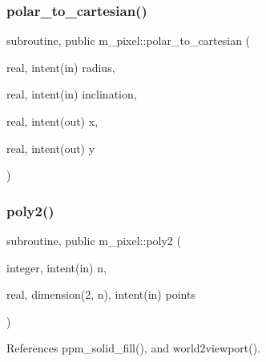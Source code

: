 \subsubsection{\texorpdfstring{polar\+\_\+to\+\_\+cartesian()}{polar\_to\_cartesian()}}
{\footnotesize\ttfamily subroutine, public m\+\_\+pixel\+::polar\+\_\+to\+\_\+cartesian (\begin{DoxyParamCaption}\item[{real, intent(in)}]{radius,  }\item[{real, intent(in)}]{inclination,  }\item[{real, intent(out)}]{x,  }\item[{real, intent(out)}]{y }\end{DoxyParamCaption})}

\mbox{\label{namespacem__pixel_a996117d631dce0e92056a0c486be5109}} 
\subsubsection{\texorpdfstring{poly2()}{poly2()}}
{\footnotesize\ttfamily subroutine, public m\+\_\+pixel\+::poly2 (\begin{DoxyParamCaption}\item[{integer, intent(in)}]{n,  }\item[{real, dimension(2, n), intent(in)}]{points }\end{DoxyParamCaption})}



References ppm\+\_\+solid\+\_\+fill(), and world2viewport().

